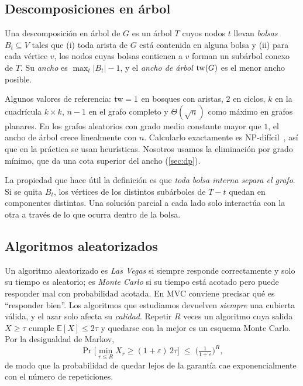 \subsection{Descomposiciones en árbol}\label{sec:td}
\begin{definition}
Una descomposición en árbol de $G$ es un árbol $T$ cuyos nodos $t$ llevan \emph{bolsas} $B_t\subseteq V$ tales que (i) toda arista de $G$ está contenida en alguna bolsa y (ii) para cada vértice $v$, los nodos cuyas bolsas contienen a $v$ forman un subárbol conexo de $T$. Su \emph{ancho} es $\max_t|B_t|-1$, y el \emph{ancho de árbol} $\mathrm{tw}(G)$ es el menor ancho posible.
\end{definition}
Algunos valores de referencia: $\mathrm{tw}=1$ en bosques con aristas, $2$ en ciclos, $k$ en la cuadrícula $k\times k$, $n-1$ en el grafo completo y $\Theta(\sqrt n)$ como máximo en grafos planares. En los grafos aleatorios con grado medio constante mayor que $1$, el ancho de árbol crece linealmente con $n$. Calcularlo exactamente es NP-difícil~\citep{arnborg1987}, así que en la práctica se usan heurísticas. Nosotros usamos la eliminación por grado mínimo, que da una cota superior del ancho (\cref{sec:dp}).

La propiedad que hace útil la definición es que \emph{toda bolsa interna separa el grafo}. Si se quita $B_t$, los vértices de los distintos subárboles de $T-t$ quedan en componentes distintas. Una solución parcial a cada lado solo interactúa con la otra a través de lo que ocurra dentro de la bolsa.

\subsection{Algoritmos aleatorizados}
Un algoritmo aleatorizado es \emph{Las Vegas} si siempre responde correctamente y solo su tiempo es aleatorio; es \emph{Monte Carlo} si su tiempo está acotado pero puede responder mal con probabilidad acotada. En MVC conviene precisar qué es ``responder bien''. Los algoritmos que estudiamos devuelven \emph{siempre} una cubierta válida, y el azar solo afecta su \emph{calidad}. Repetir $R$ veces un algoritmo cuya salida $X\ge\tau$ cumple $\mathbb E[X]\le 2\tau$ y quedarse con la mejor es un esquema Monte Carlo. Por la desigualdad de Markov,
\begin{equation}\label{eq:amplif}
\Pr\big[\min_{r\le R}X_r\ge (1+\varepsilon)\,2\tau\big]\;\le\;\Big(\tfrac{1}{1+\varepsilon}\Big)^{R},
\end{equation}
de modo que la probabilidad de quedar lejos de la garantía cae exponencialmente con el número de repeticiones.
